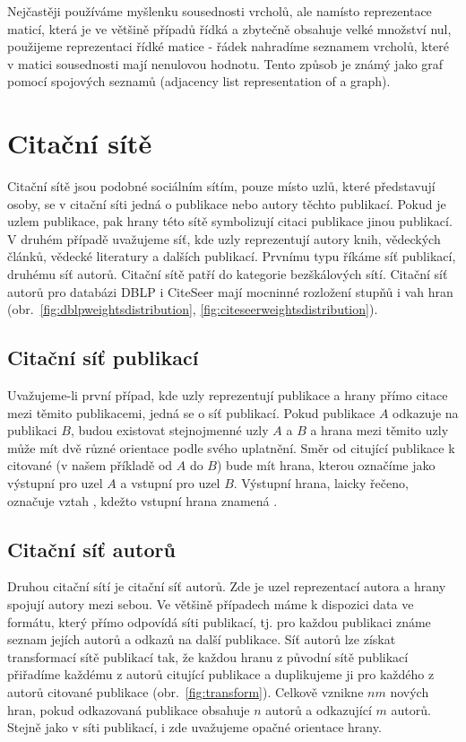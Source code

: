\documentclass{bakalarka}
\begin{document}
Nejčastěji používáme myšlenku sousednosti vrcholů, ale namísto reprezentace
maticí, která je ve většině případů řídká a zbytečně obsahuje velké množství
nul, použijeme reprezentaci řídké matice - řádek nahradíme seznamem vrcholů,
které v matici sousednosti mají nenulovou hodnotu. Tento způsob je známý jako
graf pomocí spojových seznamů (adjacency list representation of a graph).


\section{Citační sítě}
Citační sítě jsou podobné sociálním sítím, pouze místo uzlů, které představují
osoby, se v citační síti jedná o publikace nebo autory těchto publikací. Pokud
je uzlem publikace, pak hrany této sítě symbolizují citaci publikace jinou
publikací. V druhém případě uvažujeme síť, kde uzly reprezentují autory knih,
vědeckých článků, vědecké literatury a dalších publikací. Prvnímu typu říkáme
síť publikací, druhému síť autorů. Citační sítě patří do kategorie bezškálových
sítí. Citační síť autorů pro databázi DBLP i CiteSeer mají mocninné rozložení
stupňů i vah hran (obr.~\ref{fig:dblpweightsdistribution}, \ref{fig:citeseerweightsdistribution}).

\subsection{Citační síť publikací}
Uvažujeme-li první případ, kde uzly reprezentují publikace a hrany přímo citace
mezi těmito publikacemi, jedná se o síť publikací. Pokud publikace $A$ odkazuje
na publikaci $B$, budou existovat stejnojmenné uzly $A$ a $B$ a hrana mezi
těmito uzly může mít dvě různé orientace podle svého uplatnění. Směr od
citující publikace k citované (v našem příkladě od $A$ do $B$) bude mít hrana,
kterou označíme jako výstupní pro uzel $A$ a vstupní pro uzel $B$.  Výstupní
hrana, laicky řečeno, označuje vztah , kdežto vstupní hrana znamená
.

\subsection{Citační síť autorů}
Druhou citační sítí je citační síť autorů. Zde je uzel reprezentací autora a
hrany spojují autory mezi sebou. Ve většině případech máme k dispozici data ve
formátu, který přímo odpovídá síti publikací, tj. pro každou publikaci známe
seznam jejích autorů a odkazů na další publikace. Síť autorů lze získat
transformací sítě publikací tak, že každou hranu z původní sítě publikací
přiřadíme každému z autorů citující publikace a duplikujeme ji pro každého z
autorů citované publikace (obr.~\ref{fig:transform}). Celkově vznikne $nm$ nových hran, pokud odkazovaná
publikace obsahuje $n$ autorů a odkazující $m$ autorů. Stejně jako v síti
publikací, i zde uvažujeme opačné orientace hrany.
\end{document}
